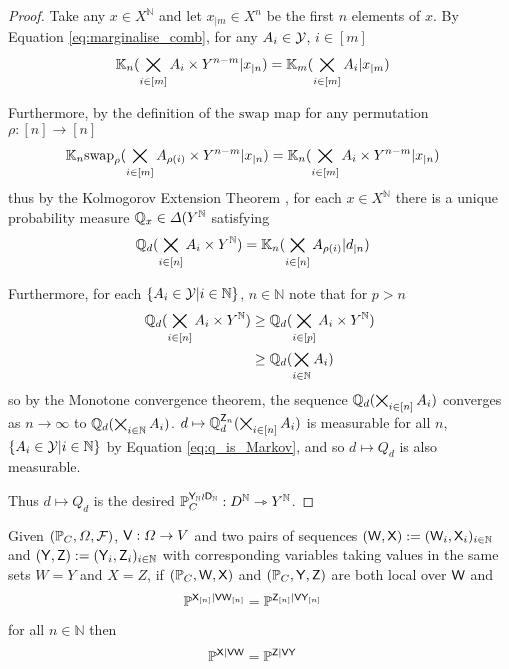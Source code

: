 \begin{proof}
Take any $x\in X^{\mathbb{N}}$ and let $x_{|m}\in X^n$ be the first $n$ elements of $x$. By Equation \ref{eq:marginalise_comb}, for any $A_i\in \mathcal{Y}$, $i\in [m]$
\begin{align}
    \mathbb{K}_n(\bigtimes_{i\in [m]}A_i\times Y^{n-m}|x_{|n}) &= \mathbb{K}_m(\bigtimes_{i\in [m]}A_i|x_{|m})
\end{align}

Furthermore, by the definition of the $\mathrm{swap}$ map for any permutation $\rho:[n]\to[n]$
\begin{align}
    \mathbb{K}_n\mathrm{swap}_{\rho}(\bigtimes_{i\in [m]}A_{\rho(i)}\times Y^{n-m}|x_{|n}) &= \mathbb{K}_n(\bigtimes_{i\in [m]}A_{i}\times Y^{n-m}|x_{|n})
\end{align}
thus by the Kolmogorov Extension Theorem \citep{cinlar_probability_2011}, for each $x\in X^{\mathbb{N}}$ there is a unique probability measure $\mathbb{Q}_x\in \Delta(Y^{\mathbb{N}}$ satisfying
\begin{align}
    \mathbb{Q}_d(\bigtimes_{i\in [n]}A_i\times Y^{\mathbb{N}}) &= \mathbb{K}_n(\bigtimes_{i\in [n]}A_{\rho(i)}|d_{|n})\label{eq:q_is_Markov}
\end{align}

Furthermore, for each $\{A_i\in\mathcal{Y}|i\in \mathbb{N}\}$, $n\in \mathbb{N}$ note that for $p>n$
\begin{align}
\mathbb{Q}_d(\bigtimes_{i\in[n]} A_i \times Y^{\mathbb{N}})&\geq \mathbb{Q}_d(\bigtimes_{i\in [p]} A_i\times Y^{\mathbb{N}})\\
&\geq \mathbb{Q}_d(\bigtimes_{i\in \mathbb{N}} A_i)
\end{align}
so by the Monotone convergence theorem, the sequence $\mathbb{Q}_d(\bigtimes_{i\in[n]} A_i)$ converges as $n\to \infty$ to $\mathbb{Q}_d(\bigtimes_{i\in\mathbb{N}} A_i)$. $d\mapsto \mathbb{Q}_d^{\mathsf{Z}_n}(\bigtimes_{i\in[n]} A_i)$ is measurable for all $n$, $\{A_i\in\mathcal{Y}|i\in \mathbb{N}\}$ by Equation \ref{eq:q_is_Markov}, and so $d\mapsto Q_d$ is also measurable.

Thus $d\mapsto Q_d$ is the desired $\mathbb{P}_C^{\mathsf{Y}_{\mathbb{N}}\wr \mathsf{D}_{\mathbb{N}}}:D^\mathbb{N}\rightarrowtriangle Y^\mathbb{N}$.
\end{proof}

\begin{corollary}\label{cor:equal_subconditionals}
Given $(\mathbb{P}_C,\Omega,\mathcal{F})$, $\mathsf{V}:\Omega\to V$ and two pairs of sequences $(\mathsf{W},\mathsf{X}):=(\mathsf{W}_i,\mathsf{X}_i)_{i\in\mathbb{N}}$ and $(\mathsf{Y},\mathsf{Z}):=(\mathsf{Y}_i,\mathsf{Z}_i)_{i\in \mathbb{N}}$ with corresponding variables taking values in the same sets $W=Y$ and $X=Z$, if $(\mathbb{P}_C,\mathsf{W},\mathsf{X})$ and $(\mathbb{P}_C,\mathsf{Y},\mathsf{Z})$ are both local over $\mathsf{W}$ and
\begin{align}
    \mathbb{P}^{\mathsf{X}_{[n]}|\mathsf{V}\mathsf{W}_{[n]}} &= \mathbb{P}^{\mathsf{Z}_{[n]}|\mathsf{V}\mathsf{Y}_{[n]}}
\end{align}
for all $n\in\mathbb{N}$ then
\begin{align}
    \mathbb{P}^{\mathsf{X}|\mathsf{V}\mathsf{W}} &= \mathbb{P}^{\mathsf{Z}|\mathsf{V}\mathsf{Y}}
\end{align}
\end{corollary}

